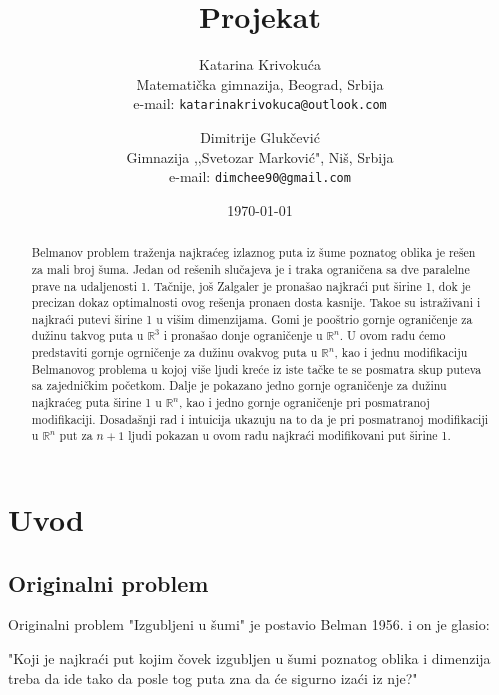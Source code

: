 \documentclass[11pt,letter]{article}
\begin{document}
\title{\bf{Projekat}}

\author{
Katarina Krivoku\'ca \\
Matemati\v cka gimnazija, Beograd, Srbija\\
e-mail: \tt{katarinakrivokuca@outlook.com} \\
\and
Dimitrije Gluk\v cevi\' c \\
Gimnazija ,,Svetozar Markovi\' c", Ni\v s, Srbija \\
e-mail: \tt{dimchee90@gmail.com} \\
}

\date{\today}
\maketitle %

\begin{abstract}
Belmanov problem tra\v zenja najkra\' ceg izlaznog puta iz \v sume poznatog oblika je re\v sen za mali broj \v suma. Jedan od re\v senih slu\v cajeva je i traka ograni\v cena sa dve paralelne prave na udaljenosti 1. Ta\v cnije, jo\v s Zalgaler je prona\v sao najkra\' ci put \v sirine 1, dok je precizan dokaz optimalnosti ovog re\v senja prona\dj en dosta kasnije. Tako\dj e su istra\v zivani i najkra\' ci putevi \v sirine 1 u vi\v sim dimenzijama. Gomi je poo\v strio gornje ograni\v cenje za du\v zinu takvog puta u $\mathbb{R}^3$ i prona\v sao donje ograni\v cenje u $\mathbb{R}^n$. U ovom radu \' cemo predstaviti gornje ogrni\v cenje za du\v zinu ovakvog puta u $\mathbb{R}^n$, kao i jednu modifikaciju Belmanovog problema u kojoj vi\v se ljudi kre\' ce iz iste ta\v cke te se posmatra skup puteva sa zajedni\v ckim po\v cetkom. Dalje je pokazano jedno gornje ograni\v cenje za du\v zinu najkra\' ceg puta \v sirine 1 u $\mathbb{R}^n$, kao i jedno gornje ograni\v cenje pri posmatranoj modifikaciji. Dosada\v snji rad i intuicija ukazuju na to da je pri posmatranoj modifikaciji u $\mathbb{R}^n$ put za $n+1$ ljudi pokazan u ovom radu najkra\' ci modifikovani put \v sirine 1.


\end{abstract}

\section[Uvod]{Uvod}
\bigskip
\subsection[Originalni problem]{Originalni problem}
\bigskip
Originalni problem "Izgubljeni u \v sumi" je postavio Belman 1956. i on je glasio:
\begin{center}
"Koji je najkra\' ci put kojim \v covek izgubljen u \v sumi poznatog oblika i dimenzija treba da ide tako da posle tog puta zna da \' ce sigurno iza\' ci iz nje?"
\end{center}
\end{document}
